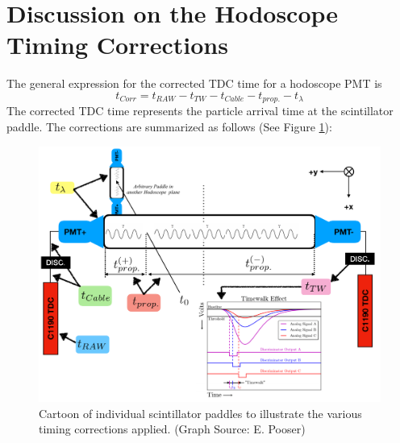 \documentclass[14pt]{article}
\begin{document}
\section{Discussion on the Hodoscope Timing Corrections}
The general expression for the corrected TDC time for a hodoscope PMT is
\begin{equation}
t_{Corr} = t_{RAW} - t_{TW} - t_{Cable} - t_{prop.} - t_{\lambda} 
\end{equation}
\newpage
The corrected TDC time represents the particle arrival time at the scintillator paddle.
The corrections are summarized as follows (See Figure \ref{fig:Paddle}):
\begin{figure}[H]
  \captionsetup{justification=raggedright,singlelinecheck=false}
  \includegraphics[scale=0.5]{HodoPaddle.pdf}
  \caption{Cartoon of individual scintillator paddles to illustrate the various timing corrections applied. (Graph Source: E. Pooser)}
  \label{fig:Paddle}
\end{figure}
\end{document}

